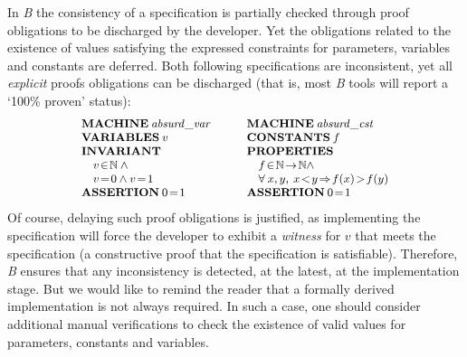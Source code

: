 \documentclass[conference]{IEEEtran}
\begin{document}
In \emph{B} the consistency of a specification is partially checked through proof obligations
to be discharged by the developer. Yet the obligations related to the existence of values
satisfying the expressed constraints for parameters, variables and constants are deferred.
Both following specifications are inconsistent, yet all \emph{explicit} proofs obligations can
be discharged (that is, most \emph{B} tools will report a `100\% proven' status):
\[\small\begin{array}{l}
\Cmd{MACHINE}\:\fid{absurd}\_\fid{var}\\
\Cmd{VARIABLES}\:v\\
\Cmd{INVARIANT}\\
\quad v\!\in\!\NAT\:\land\\
\quad v\!=\!0\land v\!=\!1\\
\Cmd{ASSERTION}\:0\!=\!1
\end{array}
\quad\quad
\begin{array}{l}
\Cmd{MACHINE}\:\fid{absurd}\_\fid{cst}\\
\Cmd{CONSTANTS}\:f\\
\Cmd{PROPERTIES}\\
\quad f\!\in\!\NAT\!\to\!\NAT\land\\
\quad \forall\:x,y,\:x\!<\!y\!\Rightarrow\!f(x)\!>\!f(y)\\
\Cmd{ASSERTION}\:0\!=\!1
\end{array}\]
Of course, delaying such proof obligations is justified, as implementing the specification
will force the developer to exhibit a \emph{witness} for {\small$v$} that meets the
specification (a constructive proof that the specification is satisfiable). Therefore,
\emph{B} ensures that any inconsistency is detected, at the latest, at the implementation
stage. But we would like to remind the reader that a formally derived implementation is not
always required. In such a case, one should consider additional manual verifications to check
the existence of valid values for parameters, constants and variables.
\end{document}
